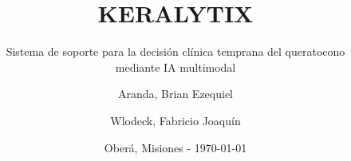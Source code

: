 
\title{KERALYTIX}
\subtitle{Sistema de soporte para la decisión clínica temprana del queratocono\\mediante IA multimodal}
\author{Aranda, Brian Ezequiel \and Wlodeck, Fabricio Joaquín}
\date{Oberá, Misiones - \today}
